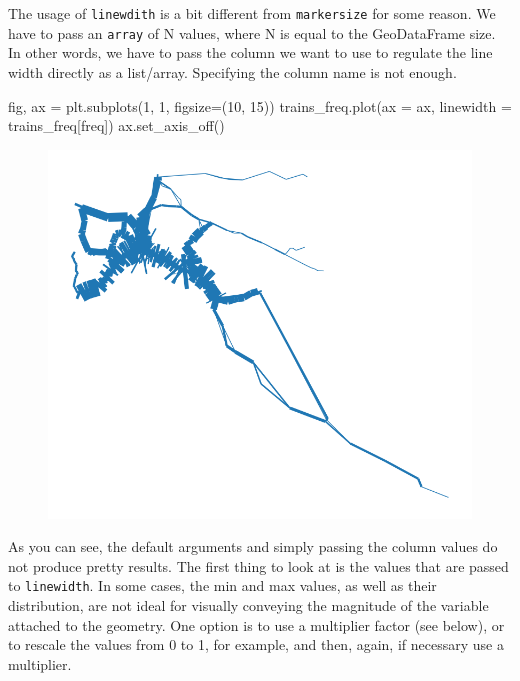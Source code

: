 \documentclass[
  letterpaper,
  DIV=11,
  numbers=noendperiod]{scrreprt}
\newenvironment{Shaded}{\begin{snugshade}}{\end{snugshade}}
\newcommand{\DecValTok}[1]{\textcolor[rgb]{0.68,0.00,0.00}{#1}}
\newcommand{\NormalTok}[1]{\textcolor[rgb]{0.00,0.23,0.31}{#1}}
\newcommand{\OperatorTok}[1]{\textcolor[rgb]{0.37,0.37,0.37}{#1}}
\newcommand{\StringTok}[1]{\textcolor[rgb]{0.13,0.47,0.30}{#1}}
\begin{document}
The usage of \texttt{linewdith} is a bit different from
\texttt{markersize} for some reason. We have to pass an \texttt{array}
of N values, where N is equal to the GeoDataFrame size. In other words,
we have to pass the column we want to use to regulate the line width
directly as a list/array. Specifying the column name is not enough.

\begin{Shaded}
\begin{Highlighting}[]
\NormalTok{fig, ax }\OperatorTok{=}\NormalTok{ plt.subplots(}\DecValTok{1}\NormalTok{, }\DecValTok{1}\NormalTok{, figsize}\OperatorTok{=}\NormalTok{(}\DecValTok{10}\NormalTok{, }\DecValTok{15}\NormalTok{))}
\NormalTok{trains\_freq.plot(ax }\OperatorTok{=}\NormalTok{ ax, linewidth }\OperatorTok{=}\NormalTok{ trains\_freq[}\StringTok{\textquotesingle{}freq\textquotesingle{}}\NormalTok{])}
\NormalTok{ax.set\_axis\_off()}
\end{Highlighting}
\end{Shaded}

\begin{figure}[H]

{\centering \includegraphics{labs/w02_maps_files/figure-pdf/cell-55-output-1.png}

}

\end{figure}

As you can see, the default arguments and simply passing the column
values do not produce pretty results. The first thing to look at is the
values that are passed to \texttt{linewidth}. In some cases, the min and
max values, as well as their distribution, are not ideal for visually
conveying the magnitude of the variable attached to the geometry. One
option is to use a multiplier factor (see below), or to rescale the
values from 0 to 1, for example, and then, again, if necessary use a
multiplier.
\end{document}
